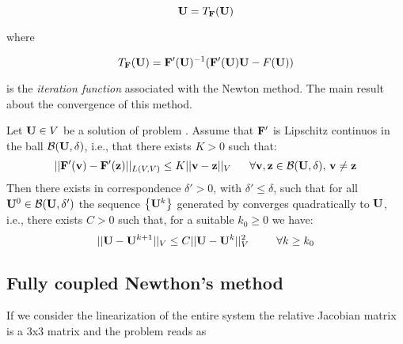 \begin{equation}
\label{eq: fixed point U}
\mathbf{U} = T_{\mathbf{F}}(\mathbf{U})
\end{equation}

where 

\begin{equation}
\label{eq: iteration function}
T_{\mathbf{F}}(\mathbf{U}) = \mathbf{F}'(\mathbf{U})^{-1}(\mathbf{F}'(\mathbf{U})\mathbf{U}-F(\mathbf{U}))
\end{equation}

is the \textit{iteration function} associated with the Newton method.
The main result about the convergence of this method.

\begin{Teorema}
\label{theorem: newton convergence}
Let  $\mathbf{U}\in V$ be a solution of problem . Assume that $\mathbf{F'}$ is Lipschitz continuos in the ball $\mathcal{B}(\mathbf{U},\delta)$, i.e., that there exists  $K>0$ such that:
\begin{equation}
||\vect{F'}(\vect{v})-\vect{F'}(\vect{z})||_{L(V,V)} \leq K ||\vect{v}-\vect{z}||_V \psp{10} \forall \vect{v},\vect{z} \in \mathcal{B}(\vect{U},\delta), \, \vect{v}\neq \vect{z}
\end{equation}
Then there exists in correspondence $\delta '>0$, with $\delta '\leq\delta$, such that for all $\mathbf{U}^0 \in \mathcal{B}(\mathbf{U},\delta ')$ the sequence $\left\{ \mathbf{U}^k \right\}$ generated by  converges quadratically to $\mathbf{U}$, i.e., there exists $C>0$ such that, for a suitable $k_0\geq 0$ we have:
\begin{equation}
\label{eq: convergece newton}
||\vect{U}-\vect{U}^{k+1}||_V\leq C||\vect{U}-\vect{U}^k||_V^2 \psp{15} \forall k\geq k_0
\end{equation}
\end{Teorema}


\subsection{Fully coupled Newthon's method}


If we consider the linearization of the entire system  the relative Jacobian matrix is a 3x3 matrix and the problem reads as

